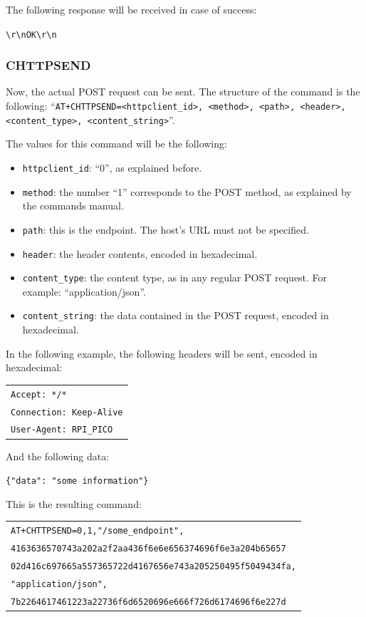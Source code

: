 The following response will be received in case of success:
\begin{center}
	\texttt{\textbackslash r\textbackslash nOK\textbackslash r\textbackslash n}
\end{center}

\subsubsection*{CHTTPSEND}
Now, the actual POST request can be sent. The structure of the command is the following: 
``\texttt{AT+CHTTPSEND=<httpclient\_id>, <method>, <path>, <header>,\\<content\_type>, 
<content\_string>}''.

The values for this command will be the following:
\begin{itemize}
	\item \texttt{httpclient\_id}: ``0'', as explained before.
	\item \texttt{method}: the number ``1'' corresponds to the POST method, as explained by the 
	commands manual.
	\item \texttt{path}: this is the endpoint. The host's URL must not be specified.
	\item \texttt{header}: the header contents, encoded in hexadecimal.
	\item \texttt{content\_type}: the content type, as in any regular POST request. For example: 
	``application/json''.
	\item \texttt{content\_string}: the data contained in the POST request, encoded in hexadecimal.
\end{itemize}

In the following example, the following headers will be sent, encoded in hexadecimal:

\begin{tabular}{l}
    \texttt{Accept: */*} \\
    \texttt{Connection: Keep-Alive} \\
    \texttt{User-Agent: RPI\_PICO}
\end{tabular}

And the following data:

\begin{center}
	\texttt{\{"data": "some information"\}}
\end{center}

This is the resulting command:

\begin{tabular}{l}
    \texttt{AT+CHTTPSEND=0,1,"/some\_endpoint",} \\
	\texttt{4163636570743a202a2f2aa436f6e6e656374696f6e3a204b65657} \\
	\texttt{02d416c697665a557365722d4167656e743a205250495f5049434fa,} \\
	\texttt{"application/json",} \\
	\texttt{7b2264617461223a22736f6d6520696e666f726d6174696f6e227d}
\end{tabular}

